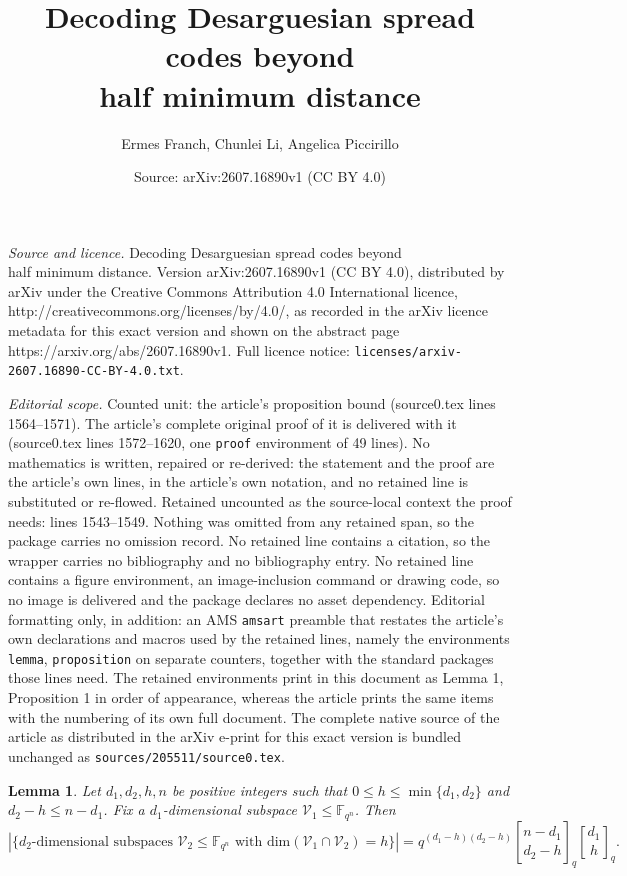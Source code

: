\documentclass[10pt,a4paper]{amsart}
\title{Decoding Desarguesian spread codes beyond \\half minimum distance}
\author{Ermes Franch, Chunlei Li, Angelica Piccirillo}
\date{Source: arXiv:2607.16890v1 (CC BY 4.0)}
\newtheorem{lemma}{Lemma}
\newcommand{\Fqn}{\mathbb{F}_{q^n}}
\newcommand{\calV}{\mathcal{V}}
\newcommand{\gbinom}[2]{\genfrac{[}{]}{0pt}{}{#1}{#2}}
\begin{document}
\maketitle

\noindent\emph{Source and licence.} Decoding Desarguesian spread codes beyond \\half minimum distance. Version arXiv:2607.16890v1 (CC BY 4.0), distributed by arXiv under the Creative Commons Attribution 4.0 International licence, http://creativecommons.org/licenses/by/4.0/, as recorded in the arXiv licence metadata for this exact version and shown on the abstract page https://arxiv.org/abs/2607.16890v1. Full licence notice: \texttt{licenses/arxiv-2607.16890-CC-BY-4.0.txt}.\par\smallskip

\noindent\textit{Editorial scope.} Counted unit: the article's proposition bound (source0.tex lines 1564--1571). The article's complete original proof of it is delivered with it (source0.tex lines 1572--1620, one \texttt{proof} environment of 49 lines). No mathematics is written, repaired or re-derived: the statement and the proof are the article's own lines, in the article's own notation, and no retained line is substituted or re-flowed.  Retained uncounted as the source-local context the proof needs: lines 1543--1549.  Nothing was omitted from any retained span, so the package carries no omission record.  No retained line contains a citation, so the wrapper carries no bibliography and no bibliography entry.  No retained line contains a figure environment, an image-inclusion command or drawing code, so no image is delivered and the package declares no asset dependency.  Editorial formatting only, in addition: an AMS \texttt{amsart} preamble that restates the article's own declarations and macros used by the retained lines, namely the environments \texttt{lemma}, \texttt{proposition} on separate counters, together with the standard packages those lines need.  The retained environments print in this document as Lemma 1, Proposition 1 in order of appearance, whereas the article prints the same items with the numbering of its own full document.  The complete native source of the article as distributed in the arXiv e-print for this exact version is bundled unchanged as \texttt{sources/205511/source0.tex}.
\begin{lemma}
        \label{lemma: counting intersections}
        Let $d_1,d_2,h,n$ be positive integers such that $0\leq h\leq \min\{d_1,d_2\}$ and $d_2-h\leq n-d_1$. Fix a $d_1$-dimensional subspace $\calV_1\leq\Fqn$. Then 
        \[
        \left\lvert\{d_2\text{-dimensional subspaces }\calV_2\leq\Fqn\text{ with }\mathrm{dim}(\calV_1\cap\calV_2)=h\}\right\rvert=q^{(d_1-h)(d_2-h)}\gbinom{n-d_1}{d_2-h}_q\gbinom{d_1}{h}_q.
        \]
    \end{lemma} 
\end{document}
